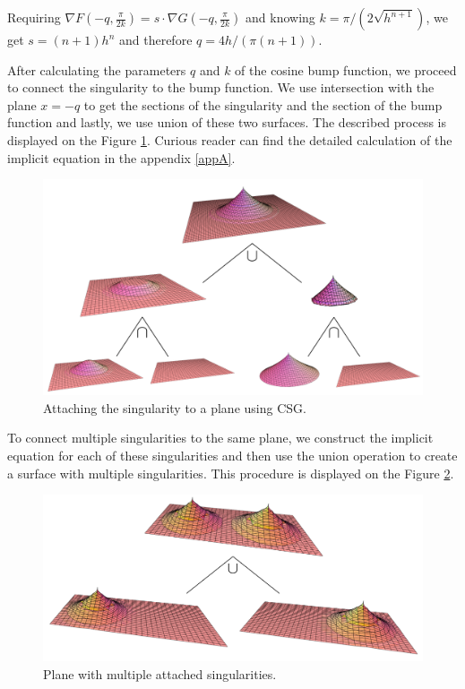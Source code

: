 Requiring $\nabla F (-q, \frac{\pi}{2k}) = s \cdot \nabla G (-q, \frac{\pi}{2k})$
and knowing $k=\pi/(2\sqrt{h^{n+1}})$, we get $s=(n+1)h^n$ and therefore $q=4h/(\pi(n+1))$.

After calculating the parameters $q$ and $k$ of the cosine bump function, 
we proceed to connect the singularity to the bump function.
We use intersection with the plane $x=-q$ to get the sections of the singularity
and the section of the bump function and lastly, we use union of these two 
surfaces. The described process is displayed on the Figure \ref{img:26}.
Curious reader can find the detailed calculation of the implicit equation in
the appendix \ref{appA}.

\begin{figure}
    \centerline{\includegraphics[scale=0.5]{images/img26}}
    \caption[Attaching the singularity to a plane using CSG]
    {Attaching the singularity to a plane using CSG.}
    \label{img:26}
\end{figure}

To connect multiple singularities to the same plane, we construct the implicit
equation for each of these singularities and then use the union operation to
create a surface with multiple singularities. This procedure is displayed on
the Figure \ref{img:28}.

\begin{figure}
    \centerline{\includegraphics[scale=0.5]{images/img28}}
    \caption[Plane with multiple attached singularities]
    {Plane with multiple attached singularities.}
    \label{img:28}
\end{figure}


